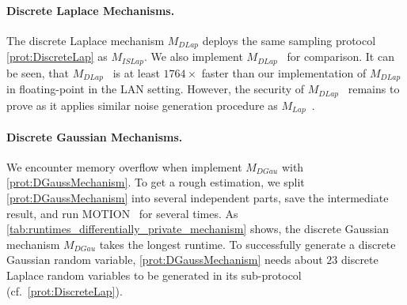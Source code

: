 \paragraph{Discrete Laplace Mechanisms.}
The discrete Laplace mechanism $M_{DLap}$ deploys the same sampling protocol \autoref{prot:DiscreteLap} as $M_{ISLap}$.
We also implement $M_{DLap}$~\cite{eigner2014differentially} for comparison.
It can be seen, that $M_{DLap}$~\cite{eigner2014differentially} is at least $1764\times$ faster than our implementation of $M_{DLap}$ in \booleanGMW floating-point in the LAN setting. However, the security of $M_{DLap}$~\cite{eigner2014differentially} remains to prove as it applies similar noise generation procedure as $M_{Lap}$~\cite{eigner2014differentially}.

\paragraph{Discrete Gaussian Mechanisms.}
We encounter memory overflow when implement \booleanGMW $M_{DGau}$ with \autoref{prot:DGaussMechanism}. To get a rough estimation, we split \autoref{prot:DGaussMechanism} into several independent parts, save the intermediate result, and run MOTION~\cite{braun2022motion} for several times.
As \autoref{tab:runtimes_differentially_private_mechanism} shows, the discrete Gaussian mechanism $M_{DGau}$ takes the longest runtime. To successfully generate a discrete Gaussian random variable, \autoref{prot:DGaussMechanism} needs about $23$ discrete Laplace random variables to be generated in its sub-protocol (cf.~\autoref{prot:DiscreteLap}).


